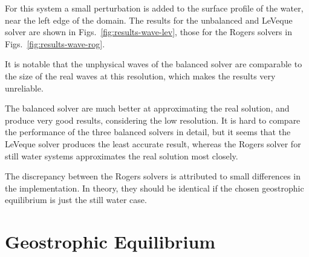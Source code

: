 For this system a small perturbation is added to the surface profile of the water, near the left edge of the domain. The results for the unbalanced and LeVeque solver are shown in Figs.~\ref{fig:results-wave-lev}, those for the Rogers solvers in Figs.~\ref{fig:results-wave-rog}.

It is notable that the unphysical waves of the balanced solver are comparable to the size of the real waves at this resolution, which makes the results very unreliable.

The balanced solver are much better at approximating the real solution, and produce very good results, considering the low resolution. It is hard to compare the performance of the three balanced solvers in detail, but it seems that the LeVeque solver produces the least accurate result, whereas the Rogers solver for still water systems approximates the real solution most closely.

The discrepancy between the Rogers solvers is attributed to small differences in the implementation. In theory, they should be identical if the chosen geostrophic equilibrium is just the still water case.

\section{Geostrophic Equilibrium}
\label{sec:results-geo}

